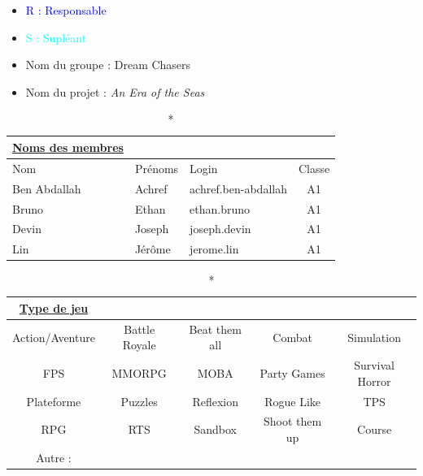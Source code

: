 \documentclass{article}
\begin{document}
\begin{itemize}
    \item \textcolor{blue}{R : Responsable}
    \item \textcolor{cyan}{S : Supléant}
\end{itemize}

















\newpage

\begin{itemize}
    \item Nom du groupe : Dream Chasers
    \item Nom du projet : \textit{An Era of the Seas}
\end{itemize}





\begin{longtable}{|l|l|l|c|}
    \caption*{\textbf{\uline{Noms des membres}}}\\
    \hline
    \rowcolor{pastelblue!60}
    Nom & Prénoms & Login & Classe\\
    \hline
    Ben Abdallah & Achref & achref.ben-abdallah & A1\\
    \hline
    Bruno & Ethan & ethan.bruno & A1\\
    \hline
    Devin & Joseph & joseph.devin & A1\\
    \hline
    Lin & Jérôme & jerome.lin & A1\\
    \hline
\end{longtable}





\begin{longtable}{|c|c|c|c|c|}
    \caption*{\textbf{\uline{Type de jeu}}}\\
    \hline
    \cellcolor{lightblue}Action/Aventure & Battle Royale & Beat them all & Combat & Simulation\\
    \hline
    \cellcolor{lightblue}FPS & MMORPG & MOBA & Party Games & Survival Horror\\
    \hline
    Plateforme & Puzzles & Reflexion & Rogue Like & TPS\\
    \hline
    \cellcolor{lightblue}RPG & RTS & Sandbox & Shoot them up & Course\\
    \hline
    Autre : & \multicolumn{4}{|c|}{}\\
    \hline
\end{longtable}
\end{document}

